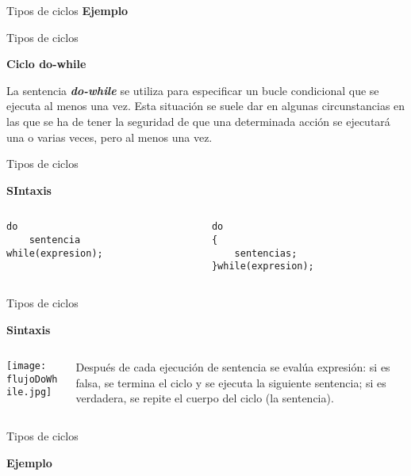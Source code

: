 \begin{frame}[fragile]{Tipos de ciclos}
    \centering
    \textbf{Ejemplo}
    
\end{frame}

\begin{frame}{Tipos de ciclos}
    \begin{center}\textbf{Ciclo do-while}\end{center}
    \justify
    La sentencia \textbf{\textit{do-while}} se utiliza para especificar un bucle condicional que se ejecuta al menos una vez. Esta situación se suele dar en algunas circunstancias en las que se ha de tener la seguridad de que una determinada acción se ejecutará una o varias veces, pero al menos una vez.
\end{frame}

\begin{frame}[fragile]{Tipos de ciclos}
    \begin{center}\textbf{SIntaxis}\end{center}
    \begin{columns}
        \begin{column}{0.5 \textwidth}
            \begin{lstlisting}
do
    sentencia
while(expresion);
            \end{lstlisting}
        \end{column}
        \begin{column}{0.5 \textwidth}
            \begin{lstlisting}
do
{
    sentencias;
}while(expresion);
            \end{lstlisting}
        \end{column}
    \end{columns}
\end{frame}

\begin{frame}{Tipos de ciclos}
    \begin{center}\textbf{Sintaxis}\end{center}
    \begin{columns}
        \begin{column}{0.5 \textwidth}
                \hspace{2mm}
                \texttt{[image: flujoDoWhile.jpg]}
        \end{column}
        \begin{column}{0.5 \textwidth}
            \justify
            Después de cada ejecución de sentencia se evalúa expresión: si es falsa, se termina el
            ciclo y se ejecuta la siguiente sentencia; si es verdadera, se repite el cuerpo del ciclo (la sentencia).
        \end{column}
    \end{columns}
\end{frame}

\begin{frame}[fragile]{Tipos de ciclos}
    \begin{center}\textbf{Ejemplo}\end{center}
    
\end{frame}